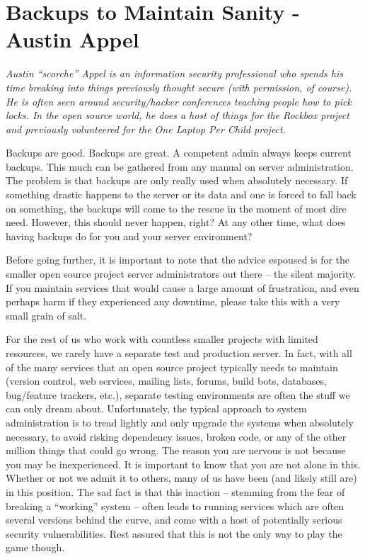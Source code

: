 \chapter{Backups to Maintain Sanity - Austin Appel}

\textit{Austin ``scorche'' Appel is an information security professional who spends
his time breaking into things previously thought secure (with permission, of 
course). He is often seen around security/hacker conferences teaching people how
to pick locks. In the open source world, he does a host of things for the Rockbox
project and previously volunteered for the One Laptop Per Child project.}

Backups are good. Backups are great. A competent admin always keeps current
backups.  This much can be gathered from any manual on server administration.
The problem is that backups are only really used when absolutely necessary.
If something drastic happens to the server or its data and one is forced to fall
back on something, the backups will come to the rescue in the moment of most
dire need. However, this should never happen, right? At any other time, what does
having backups do for you and your server environment?

Before going further, it is important to note that the advice espoused is for
the smaller open source project server administrators out there -- the silent
majority. If you maintain services that would cause a large amount of
frustration, and even perhaps harm if they experienced any downtime, please take
this with a very small grain of salt.

For the rest of us who work with countless smaller projects with limited
resources, we rarely have a separate test and production server. In fact, with
all of the many services that an open source project typically needs to maintain
(version control, web services, mailing lists, forums, build bots, databases,
bug/feature trackers, etc.), separate testing environments are often the stuff
we can only dream about. Unfortunately, the typical approach to system
administration is to tread lightly and only upgrade the systems when absolutely
necessary, to avoid risking dependency issues, broken code, or any of the other
million things that could go wrong. The reason you are nervous is not because
you may be inexperienced. It is important to know that you are not alone in
this. Whether or not we admit it to others, many of us have been (and likely
still are) in this position. The sad fact is that this inaction -- stemming from
the fear of breaking a ``working'' system -- often leads to running services which 
are often several versions behind the curve, and come with a host of potentially
serious security vulnerabilities. Rest assured that this is not the only way to play
the game though.

